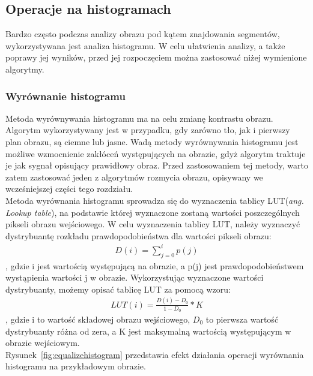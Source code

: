 \subsection{Operacje na histogramach}
Bardzo często podczas analizy obrazu pod kątem znajdowania segmentów, wykorzystywana jest analiza histogramu. W celu ułatwienia analizy, a także poprawy jej wyników, przed jej rozpoczęciem można zastosować niżej wymienione algorytmy.
\subsubsection{Wyrównanie histogramu}
Metoda wyrównywania histogramu ma na celu zmianę kontrastu obrazu. Algorytm wykorzystywany jest w przypadku, gdy zarówno tło, jak i pierwszy plan obrazu, są ciemne lub jasne. Wadą metody wyrównywania histogramu jest możliwe wzmocnienie zakłóceń występujących na obrazie, gdyż algorytm traktuje je jak sygnał opisujący prawidłowy obraz. Przed zastosowaniem tej metody, warto zatem zastosować jeden z algorytmów rozmycia obrazu, opisywany we wcześniejszej części tego rozdziału.\\
Metoda wyrównania histogramu sprowadza się do wyznaczenia tablicy LUT(\textit{ang. Lookup table}), na podstawie której wyznaczone zostaną wartości poszczególnych pikseli obrazu wejściowego. W celu wyznaczenia tablicy LUT, należy wyznaczyć dystrybuantę rozkładu prawdopodobieństwa dla wartości pikseli obrazu:
\begin{gather*}
  D(i) = \sum\limits_{j=0}^i p(j)
\end{gather*}, gdzie i jest wartością występującą na obrazie, a p(j) jest prawdopodobieństwem wystąpienia wartości j w obrazie. Wykorzystując wyznaczone wartości dystrybuanty, możemy opisać tablicę LUT za pomocą wzoru:
\begin{gather*}
  LUT(i) = \frac{D(i)-D_0}{1-D_0}*K
\end{gather*}, gdzie i to wartość składowej obrazu wejściowego, $D_0$ to pierwsza wartość dystrybuanty różna od zera, a K jest maksymalną wartością występującym w obrazie wejściowym.\\
Rysunek~\ref{fig:equalizehistogram} przedstawia efekt działania operacji wyrównania histogramu na przykładowym obrazie.
